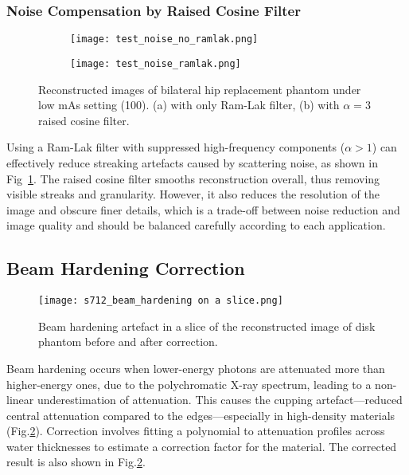 \documentclass[10pt,twocolumn]{article}
\begin{document}
\subsubsection{Noise Compensation by Raised Cosine Filter}
\begin{figure}[htbp]
    \centering
    \begin{subfigure}[b]{0.46\linewidth}
        \texttt{[image: test\_noise\_no\_ramlak.png]}
        \caption{}
    \end{subfigure}
    \begin{subfigure}[b]{0.46\linewidth}
        \texttt{[image: test\_noise\_ramlak.png]}
        \caption{}
    \end{subfigure}
    \caption{Reconstructed images of bilateral hip replacement phantom under low mAs setting (100). (a) with only Ram-Lak filter, (b) with $\alpha=3$ raised cosine filter.}
    \label{fig:noise_ramlak}
\end{figure}
Using a Ram-Lak filter with suppressed high-frequency components ($\alpha > 1$) can effectively reduce streaking artefacts caused by scattering noise, as shown in Fig~\ref{fig:noise_ramlak}.
The raised cosine filter smooths reconstruction overall, thus removing visible streaks and granularity. However, it also reduces the resolution of the image and obscure finer details, which is a trade-off between noise reduction and image quality and should be balanced carefully according to each application.

\subsection{Beam Hardening Correction}
\vspace{-1em}
\begin{figure}[htbp]
    \centering
    \texttt{[image: s712\_beam\_hardening on a slice.png]}
    \caption{Beam hardening artefact in a slice of the reconstructed image of disk phantom before and after correction.}
    \label{fig:beam_hardening}
\end{figure}
Beam hardening occurs when lower-energy photons are attenuated more than higher-energy ones, due to the polychromatic X-ray spectrum, leading to a non-linear underestimation of attenuation. This causes the cupping artefact—reduced central attenuation compared to the edges—especially in high-density materials (Fig.\ref{fig:beam_hardening}).
Correction involves fitting a polynomial to attenuation profiles across water thicknesses to estimate a correction factor for the material. The corrected result is also shown in Fig.\ref{fig:beam_hardening}.
\end{document}
